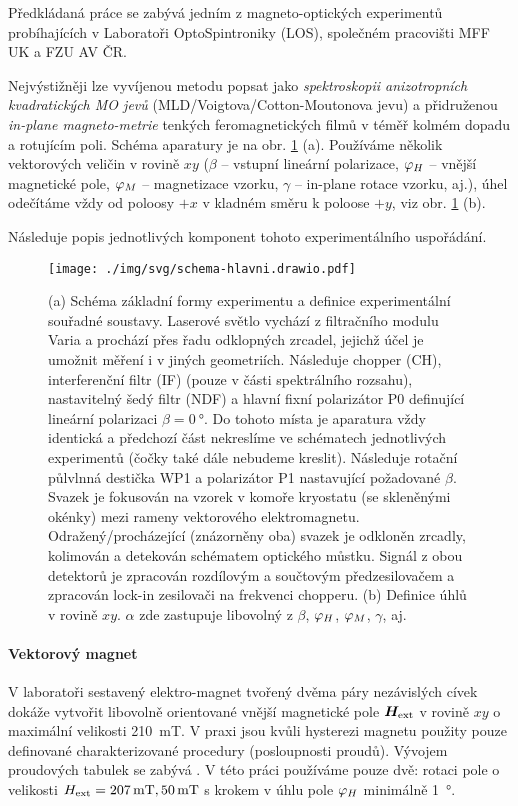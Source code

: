 Předkládaná práce se zabývá jedním z magneto-optických experimentů probíhajících v Laboratoři OptoSpintroniky (LOS), společném pracovišti MFF UK a FZU AV ČR.

Nejvýstižněji lze vyvíjenou metodu popsat jako \emph{spektroskopii anizotropních kvadratických MO jevů} (MLD/Voigtova/Cotton-Moutonova jevu) a přidruženou \emph{in-plane magneto-metrie} tenkých feromagnetických filmů v téměř kolmém dopadu a rotujícím poli.
Schéma aparatury je na obr. \ref{fig:zakladni-schema} (a).
Používáme několik vektorových veličin v rovině $xy$ ($\beta$ -- vstupní lineární polarizace, $\varphi_H$ -- vnější magnetické pole, $\varphi_M$ -- magnetizace vzorku, $\gamma$ -- in-plane rotace vzorku, aj.), úhel odečítáme vždy od poloosy $+x$ v kladném směru k poloose $+y$, viz obr. \ref{fig:zakladni-schema} (b).

Následuje popis jednotlivých komponent tohoto experimentálního uspořádání.

\begin{figure}[htbp]
    \centering
    \texttt{[image: ./img/svg/schema-hlavni.drawio.pdf]}
    \caption{(a) Schéma základní formy experimentu a definice experimentální souřadné soustavy.
    Laserové světlo vychází z filtračního modulu Varia a prochází přes řadu odklopných zrcadel, jejichž účel je umožnit měření i v jiných geometriích.
Následuje chopper (CH), interferenční filtr (IF) (pouze v části spektrálního rozsahu), nastavitelný šedý filtr (NDF) a hlavní fixní polarizátor P0 definující lineární polarizaci $\beta=\SI{0}{\degree}$.
Do tohoto místa je aparatura vždy identická a předchozí část nekreslíme ve schématech jednotlivých experimentů (čočky také dále nebudeme kreslit).
Následuje rotační půlvlnná destička WP1 a polarizátor P1 nastavující požadované $\beta$.
Svazek je fokusován na vzorek v komoře kryostatu (se skleněnými okénky) mezi rameny vektorového elektromagnetu.
Odražený/procházející (znázorněny oba) svazek je odkloněn zrcadly, kolimován a detekován schématem optického můstku.
Signál z obou detektorů je zpracován rozdílovým a součtovým předzesilovačem a zpracován lock-in zesilovači na frekvenci chopperu.
(b) Definice úhlů v rovině $xy$. $\alpha$ zde zastupuje libovolný z $\beta$, $\varphi_H$, $\varphi_M$, $\gamma$, aj.}
    \label{fig:zakladni-schema}
\end{figure}

\paragraph{Vektorový magnet}
V laboratoři sestavený elektro-magnet tvořený dvěma páry nezávislých cívek dokáže vytvořit libovolně orientované vnější magnetické pole $\bm{H}_\textrm{ext}$ v rovině $xy$ o maximální velikosti \SI{210}{\milli\tesla}.
V praxi jsou kvůli hysterezi magnetu použity pouze definované charakterizované procedury (posloupnosti proudů).
Vývojem proudových tabulek se zabývá \cite{kimakCharakterizaciaDvojdimenzionalnehoElektromagnetu2017,kimakOptickaSpektroskopieAntiferomagnetu2019}.
V této práci používáme pouze dvě: rotaci pole o velikosti $H_\textrm{ext}=\SI{207}{\milli\tesla}, \SI{50}{\milli\tesla}$ s krokem v úhlu pole $\varphi_H$ minimálně \SI{1}{\degree}.

